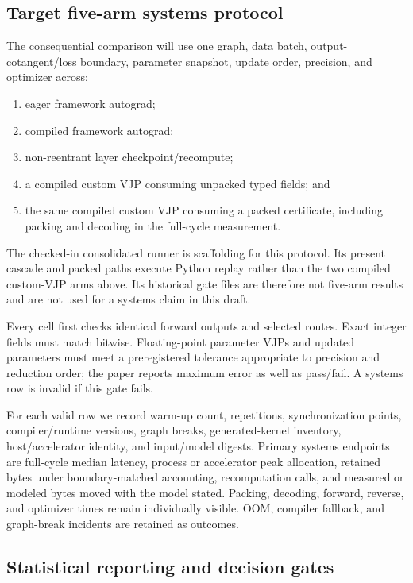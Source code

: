\subsection{Target five-arm systems protocol}
\label{sec:five-arm}

The consequential comparison will use one graph, data batch, output-cotangent/loss
boundary, parameter snapshot, update order, precision, and optimizer across:
\begin{enumerate}[leftmargin=1.5em]
  \item eager framework autograd;
  \item compiled framework autograd;
  \item non-reentrant layer checkpoint/recompute;
  \item a compiled custom VJP consuming unpacked typed fields; and
  \item the same compiled custom VJP consuming a packed certificate, including
  packing and decoding in the full-cycle measurement.
\end{enumerate}

The checked-in consolidated runner is scaffolding for this protocol.  Its
present cascade and packed paths execute Python replay rather than the two
compiled custom-VJP arms above.  Its historical gate files are therefore not
five-arm results and are not used for a systems claim in this draft.

Every cell first checks identical forward outputs and selected routes.  Exact
integer fields must match bitwise.  Floating-point parameter VJPs and updated
parameters must meet a preregistered tolerance appropriate to precision and
reduction order; the paper reports maximum error as well as pass/fail.  A
systems row is invalid if this gate fails.

For each valid row we record warm-up count, repetitions, synchronization
points, compiler/runtime versions, graph breaks, generated-kernel inventory,
host/accelerator identity, and input/model digests.  Primary systems endpoints
are full-cycle median latency, process or accelerator peak allocation, retained
bytes under boundary-matched accounting, recomputation calls, and measured or
modeled bytes moved with the model stated.  Packing, decoding, forward,
reverse, and optimizer times remain individually visible.  OOM, compiler
fallback, and graph-break incidents are retained as outcomes.

\subsection{Statistical reporting and decision gates}

